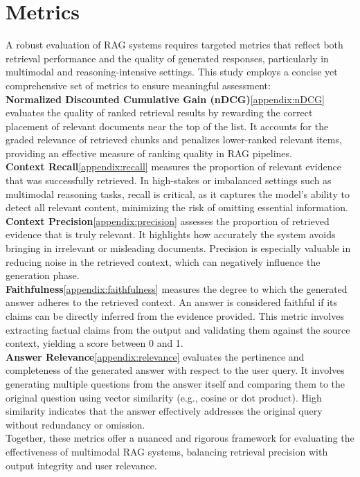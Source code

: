 \documentclass[12pt,twoside]{report}
\begin{document}
\section{Metrics}
A robust evaluation of RAG systems requires targeted metrics that reflect both retrieval performance and the quality of generated responses, particularly in multimodal and reasoning-intensive settings. This study employs a concise yet comprehensive set of metrics to ensure meaningful assessment: \\
\textbf{Normalized Discounted Cumulative Gain (nDCG)}\ref{appendix:nDCG} evaluates the quality of ranked retrieval results by rewarding the correct placement of relevant documents near the top of the list. It accounts for the graded relevance of retrieved chunks and penalizes lower-ranked relevant items, providing an effective measure of ranking quality in RAG pipelines. \\
\textbf{Context Recall}\ref{appendix:recall} measures the proportion of relevant evidence that was successfully retrieved. In high-stakes or imbalanced settings such as multimodal reasoning tasks, recall is critical, as it captures the model's ability to detect all relevant content, minimizing the risk of omitting essential information. \\
\textbf{Context Precision}\ref{appendix:precision} assesses the proportion of retrieved evidence that is truly relevant. It highlights how accurately the system avoids bringing in irrelevant or misleading documents. Precision is especially valuable in reducing noise in the retrieved context, which can negatively influence the generation phase. \\
\textbf{Faithfulness}\ref{appendix:faithfulness} measures the degree to which the generated answer adheres to the retrieved context. An answer is considered faithful if its claims can be directly inferred from the evidence provided. This metric involves extracting factual claims from the output and validating them against the source context, yielding a score between 0 and 1. \\
\textbf{Answer Relevance}\ref{appendix:relevance} evaluates the pertinence and completeness of the generated answer with respect to the user query. It involves generating multiple questions from the answer itself and comparing them to the original question using vector similarity (e.g., cosine or dot product). High similarity indicates that the answer effectively addresses the original query without redundancy or omission. \\
Together, these metrics offer a nuanced and rigorous framework for evaluating the effectiveness of multimodal RAG systems, balancing retrieval precision with output integrity and user relevance.
\end{document}

